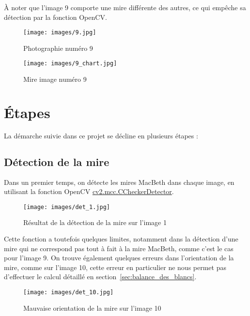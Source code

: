 \documentclass[12pt]{article}
\begin{document}
À noter que l'image 9 comporte une mire différente des autres, ce qui empêche sa détection par la fonction OpenCV.

\begin{figure}[H]
    \centering
    \begin{minipage}{0.48\textwidth}
        \centering
        \texttt{[image: images/9.jpg]}
        \caption{Photographie numéro 9}
    \end{minipage}
    \hfill
    \begin{minipage}{0.48\textwidth}
        \centering
        \texttt{[image: images/9\_chart.jpg]}
        \caption{Mire image numéro 9}
    \end{minipage}
\end{figure}

\clearpage

\section{Étapes}

La démarche suivie dans ce projet se décline en plusieurs étapes :

\subsection{Détection de la mire}

Dans un premier temps, on détecte les mires MacBeth dans chaque image, en utilisant la fonction OpenCV \href{https://docs.opencv.org/4.x/dd/d19/group__mcc.html\#gga836ee96afcefd4f35e95760ca9e8163da3c0b5a40e1157d57f944cab818e7311d}{cv2.mcc.CCheckerDetector}.

\begin{figure}[H]
    \centering
    \texttt{[image: images/det\_1.jpg]}
    \caption{Résultat de la détection de la mire sur l'image 1}
\end{figure}

Cette fonction a toutefois quelques limites, notamment dans la détection d'une mire qui ne correspond pas tout à fait à la mire MacBeth, comme c'est le cas pour l'image 9. 
On trouve également quelques erreurs dans l'orientation de la mire, comme sur l'image 10, cette erreur en particulier ne nous permet pas d'effectuer le calcul détaillé en section~\ref{sec:balance_des_blancs}.

\begin{figure}[H]
    \centering
    \texttt{[image: images/det\_10.jpg]}
    \caption{Mauvaise orientation de la mire sur l'image 10}
\end{figure}
\end{document}
